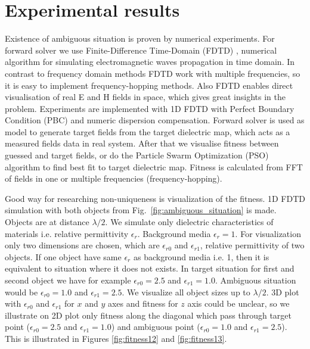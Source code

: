\documentclass[conference]{IEEEtran}
\begin{document}
\section{Experimental results}
Existence of ambiguous situation is proven by numerical experiments.
For forward solver we use Finite-Difference Time-Domain (FDTD) \cite{FDTDbible},
numerical algorithm for simulating electromagnetic waves propagation in time domain.
In contrast to frequency domain methods FDTD work with multiple frequencies,
so it is easy to implement frequency-hopping methods.
Also FDTD enables direct visualisation of real E and H fields in space,
which gives great insights in the problem.
Experiments are implemented with 1D FDTD with Perfect Boundary Condition (PBC) 
and numeric dispersion compensation. %
Forward solver is used as model to generate target fields from the target dielectric map,
which acts as a measured fields data in real system.
After that we visualise fitness between guessed and target fields,
or do the Particle Swarm Optimization (PSO) \cite{SecondOldestPSOPaper} algorithm
to find best fit to target dielectric map.
Fitness is calculated from FFT of fields in one or multiple frequencies (frequency-hopping).
\par
Good way for researching non-uniqueness is visualization of the fitness.
1D FDTD simulation with both objects from Fig.~\ref{fig:ambiguous_situation} is made.
Objects are at distance $\lambda/2$.
We simulate only dielectric characteristics of materials i.e. relative permittivity $\epsilon_r$.
Background media $\epsilon_r = 1$.
For visualization only two dimensions are chosen,
which are $\epsilon_{r0}$ and $\epsilon_{r1}$, relative permittivity of two objects.
If one object have same $\epsilon_r$ as background media i.e. 1, 
then it is equivalent to situation where it does not exists.
In target situation for first and second object we have for example
$\epsilon_{r0} = 2.5$ and $\epsilon_{r1} = 1.0$.
Ambiguous situation would be $\epsilon_{r0} = 1.0$ and $\epsilon_{r1} = 2.5$.
We visualize all object sizes up to $\lambda/2$.
3D plot with $\epsilon_{r0}$ and $\epsilon_{r1}$ 
for $x$ and $y$ axes and fitness for $z$ axis could be unclear,
so we illustrate on 2D plot only fitness along the diagonal which pass through 
target point ($\epsilon_{r0} = 2.5$ and $\epsilon_{r1} = 1.0$) 
and ambiguous point ($\epsilon_{r0} = 1.0$ and $\epsilon_{r1} = 2.5$).
This is illustrated in Figures \ref{fig:fitness12} and \ref{fig:fitness13}.
\end{document}
